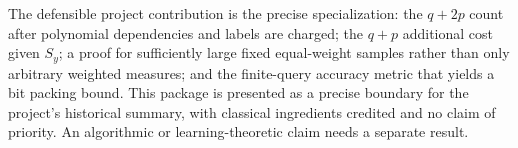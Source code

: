The defensible project contribution is the precise specialization:
the $q+2p$ count after polynomial dependencies and labels are charged;
the $q+p$ additional cost given $S_y$; a proof for sufficiently large
fixed equal-weight samples rather than only arbitrary weighted
measures; and the finite-query accuracy metric that yields a bit
packing bound. This package is presented as a precise boundary for the project's
historical summary, with classical ingredients credited and no claim of
priority. An algorithmic or learning-theoretic claim needs a separate result.

